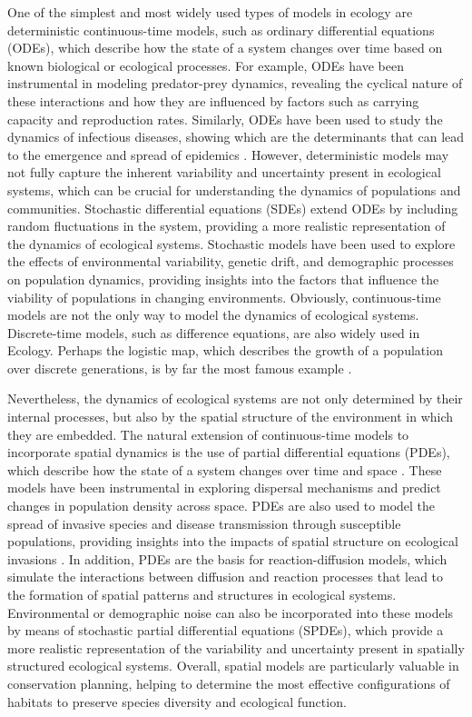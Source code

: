 One of the simplest and most widely used types of models in ecology are
deterministic continuous-time models, such as ordinary differential equations
(ODEs), which describe how the state of a system changes over time based on
known biological or ecological processes. For example, ODEs have been
instrumental in modeling predator-prey dynamics, revealing the cyclical nature
of these interactions and how they are influenced by factors such as carrying
capacity and reproduction rates. Similarly, ODEs have been used to study the
dynamics of infectious diseases, showing which are the determinants that can
lead to the emergence and spread of epidemics \cite{Murray_book}. However,
deterministic models may not fully capture the inherent variability
and uncertainty present in ecological systems, which can be crucial for
understanding the dynamics of populations and communities. Stochastic
differential equations (SDEs) extend ODEs by including random fluctuations in
the system, providing a more realistic representation of the dynamics of
ecological systems. Stochastic models have been used to explore the effects of
environmental variability, genetic drift, and demographic processes on
population dynamics, providing insights into the factors that influence the
viability of populations in changing environments. Obviously, continuous-time
models are not the only way to model the dynamics of ecological systems.
Discrete-time models, such as difference equations, are also widely used in
Ecology. Perhaps the logistic map, which describes the growth of a population
over discrete generations, is by far the most famous example \cite{May1976}.

Nevertheless, the dynamics of ecological systems are not only determined by
their internal processes, but also by the spatial structure of the environment
in which they are embedded. The natural extension of continuous-time models to
incorporate spatial dynamics is the use of partial differential equations
(PDEs), which describe how the state of a system changes over time and
space \cite{Murray_book}. These models have been instrumental in exploring
dispersal mechanisms and predict changes in population density across space.
PDEs are also used to model the spread of invasive species and disease
transmission through susceptible populations, providing insights into the
impacts of spatial structure on ecological invasions
\cite{tilman1997spatial}. In addition, PDEs are the basis for
reaction-diffusion models, which simulate the interactions between diffusion
and reaction processes that lead to the formation of spatial patterns and
structures in ecological systems. Environmental or demographic noise can also
be incorporated into these models by means of stochastic partial differential
equations (SPDEs), which provide a more realistic representation of the
variability and uncertainty present in spatially structured ecological systems.
Overall, spatial models are particularly valuable in conservation planning,
helping to determine the most effective configurations of habitats to preserve
species diversity and ecological function.

